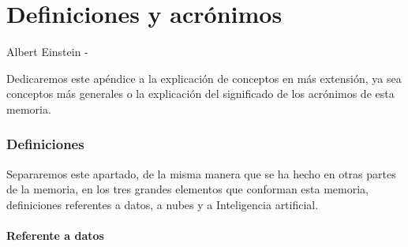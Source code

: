 \chapter{Definiciones y acrónimos}
\label{Appendix:1}

 {Albert Einstein}
-

Dedicaremos este apéndice a la explicación de conceptos en más extensión, ya sea conceptos más generales o la explicación del significado de los acrónimos de esta memoria.

\subsection{Definiciones}

Separaremos este apartado, de la misma manera que se ha hecho en otras partes de la memoria, en los tres grandes elementos que conforman esta memoria, definiciones referentes a datos, a nubes y a Inteligencia artificial.

\subsubsection{Referente a datos}

